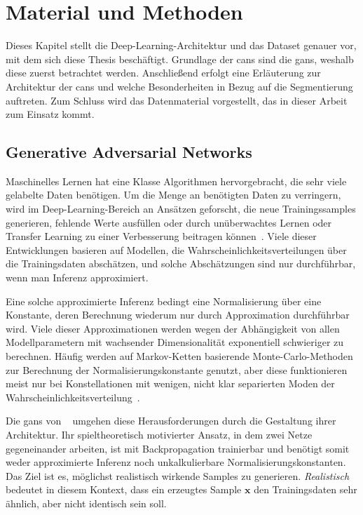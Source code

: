 \chapter{Material und Methoden}

Dieses Kapitel stellt die Deep-Learning-Architektur und das Dataset genauer vor, mit dem sich diese Thesis beschäftigt.
Grundlage der \glspl{can} sind die \glspl{gan}, weshalb diese zuerst betrachtet werden.
Anschließend erfolgt eine Erläuterung zur Architektur der \glspl{can} und welche Besonderheiten in Bezug auf die Segmentierung auftreten.
Zum Schluss wird das Datenmaterial vorgestellt, das in dieser Arbeit zum Einsatz kommt.



\section{Generative Adversarial Networks}

Maschinelles Lernen hat eine Klasse Algorithmen hervorgebracht, die sehr viele gelabelte Daten benötigen.
Um die Menge an benötigten Daten zu verringern, wird im Deep-Learning-Bereich an Ansätzen geforscht, die neue Trainingssamples generieren, fehlende Werte ausfüllen oder durch unüberwachtes Lernen oder Transfer Learning zu einer Verbesserung beitragen können~\cite{Goodfellow.2016}.
Viele dieser Entwicklungen basieren auf Modellen, die Wahrscheinlichkeitsverteilungen über die Trainingsdaten abschätzen, und solche Abschätzungen sind nur durchführbar, wenn man Inferenz approximiert.

Eine solche approximierte Inferenz bedingt eine Normalisierung über eine Konstante, deren Berechnung wiederum nur durch Approximation durchführbar wird.
Viele dieser Approximationen werden wegen der Abhängigkeit von allen Modellparametern mit wachsender Dimensionalität exponentiell schwieriger zu berechnen.
Häufig werden auf Markov-Ketten basierende Monte-Carlo-Methoden~\cite{Koller.2009} zur Berechnung der Normalisierungskonstante genutzt, aber diese funktionieren meist nur bei Konstellationen mit wenigen, nicht klar separierten Moden der Wahrscheinlichkeitsverteilung~\cite{Goodfellow.2016}.

Die \glspl{gan} von \citeauthor{Goodfellow.2014}~\cite{Goodfellow.2014} umgehen diese Herausforderungen durch die Gestaltung ihrer Architektur.
Ihr spieltheoretisch motivierter Ansatz, in dem zwei Netze gegeneinander arbeiten, ist mit Backpropagation trainierbar und benötigt somit weder approximierte Inferenz noch unkalkulierbare Normalisierungskonstanten.
Das Ziel ist es, möglichst realistisch wirkende Samples zu generieren.
\emph{Realistisch} bedeutet in diesem Kontext, dass ein erzeugtes Sample $ \mathbf{x} $ den Trainingsdaten sehr ähnlich, aber nicht identisch sein soll.

